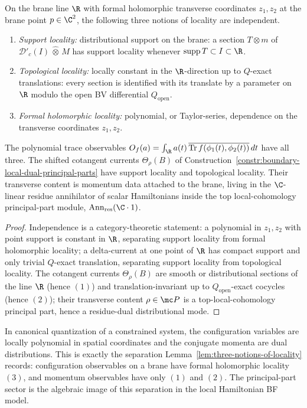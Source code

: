 \documentclass[11pt]{memoir}
\begin{document}
\begin{lem}\label{lem:three-notions-of-locality}
  On the brane line $\R$ with formal holomorphic transverse coordinates
  $z_1,z_2$ at the brane point $p\in\C^2$, the following three notions of
  locality are independent.
  \begin{enumerate}
    \item \emph{Support locality:} distributional support on the
      brane: a section $T\otimes m$ of $\mathcal D'_c(I)\,\widehat\otimes\,M$
      has support locality whenever $\mathrm{supp}\,T\subset I\subset\R$.
    \item \emph{Topological locality:} locally constant in the
      $\R$-direction up to $Q$-exact translations: every section is
      identified with its translate by a parameter on $\R$ modulo the open
      BV differential $Q_{\mathrm{open}}$.
    \item \emph{Formal holomorphic locality:} polynomial, or
      Taylor-series, dependence on the transverse coordinates $z_1,z_2$.
  \end{enumerate}
  The polynomial trace observables
  $O_f(a)=\int_\R a(t)\,
   \overline{\mathrm{Tr}\,f(\phi_1(t),\phi_2(t))}\,dt$ have all three. The
  shifted cotangent currents $\Theta_\rho(B)$ of
  Construction~\ref{constr:boundary-local-dual-principal-parts} have
  support locality and topological locality.  Their transverse content
  is momentum data attached to the brane, living in the \(\C\)-linear
  residue annihilator of scalar
  Hamiltonians inside the top local-cohomology principal-part module,
  \(\operatorname{Ann}_{\mathrm{res}}(\C\cdot1)\).
\end{lem}

\begin{proof}
  Independence is a category-theoretic statement: a polynomial in $z_1,z_2$
  with point support is constant in $\R$, separating support locality from
  formal holomorphic locality; a delta-current at one point of $\R$ has
  compact support and only trivial \(Q\)-exact translation, separating
  support locality from topological locality. The cotangent
  currents $\Theta_\rho(B)$ are smooth or distributional sections of the
  line $\R$ (hence $(1)$) and translation-invariant up to
  $Q_{\mathrm{open}}$-exact cocycles (hence $(2)$); their transverse
  content \(\rho\in\mc P\) is a top-local-cohomology principal part,
  hence a residue-dual distributional mode.
\end{proof}

\begin{rmk}\label{rmk:locality-canonical-quantization}
  In canonical quantization of a constrained system, the configuration
  variables are locally polynomial in spatial coordinates and the conjugate
  momenta are dual distributions. This is exactly the separation
  Lemma~\ref{lem:three-notions-of-locality} records: configuration
  observables on a brane have formal holomorphic locality $(3)$, and
  momentum observables have only $(1)$ and $(2)$. The principal-part
  sector is the algebraic image of this separation in the local Hamiltonian
  BF model.
\end{rmk}
\end{document}
